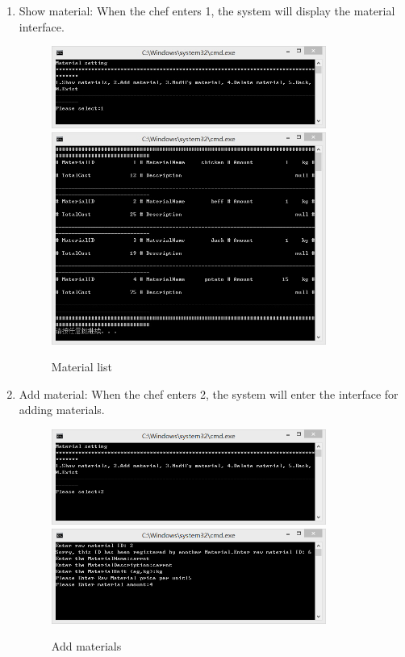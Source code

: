 \documentclass{article}
\begin{document}
\begin{enumerate}
    \item Show material:\newline 
    When the chef enters 1, the system will display the material interface.
        \begin{figure}[H]
        \centering
        \includegraphics[width=0.85\textwidth]{Q/2/Q_1a.jpg}
        \includegraphics[width=0.85\textwidth]{Q/2/Q_1b.jpg}
        \caption{Material list}
        \end{figure}
        
    \item Add material:\newline 
    When the chef enters 2, the system will enter the interface for adding materials.
        \begin{figure}[H]
        \centering
        \includegraphics[width=0.85\textwidth]{Q/2/222221.png}
        \includegraphics[width=0.85\textwidth]{Q/2/222222.png}
        \caption{Add materials}
        \end{figure}
        

\end{enumerate}
\end{document}
